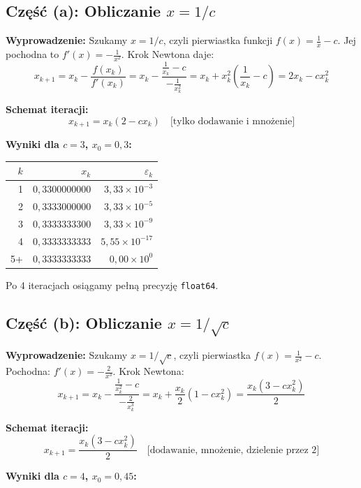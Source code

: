 \documentclass[12pt, a4paper]{article}
\begin{document}
\subsection{Część (a): Obliczanie $x = 1/c$}

\textbf{Wyprowadzenie:} Szukamy $x = 1/c$, czyli pierwiastka funkcji $f(x) = \frac{1}{x} - c$. Jej pochodna to $f'(x) = -\frac{1}{x^2}$. Krok Newtona daje:
\[
  x_{k+1} = x_k - \frac{f(x_k)}{f'(x_k)} = x_k - \frac{\frac{1}{x_k} - c}{-\frac{1}{x_k^2}} = x_k + x_k^2\left(\frac{1}{x_k} - c\right) = 2x_k - cx_k^2
\]

\textbf{Schemat iteracji:}
\[
  x_{k+1} = x_k(2 - cx_k) \quad \text{[tylko dodawanie i mnożenie]}
\]

\textbf{Wyniki dla $c = 3$, $x_0 = 0{,}3$:}

\begin{center}
\begin{tabular}{r|r|r}
\toprule
$k$ & $x_k$ & $\varepsilon_k$ \\
\midrule
1 & $0{,}3300000000$ & $3{,}33 \times 10^{-3}$ \\
2 & $0{,}3333000000$ & $3{,}33 \times 10^{-5}$ \\
3 & $0{,}3333333300$ & $3{,}33 \times 10^{-9}$ \\
4 & $0{,}3333333333$ & $5{,}55 \times 10^{-17}$ \\
5+ & $0{,}3333333333$ & $0{,}00 \times 10^{0}$ \\
\bottomrule
\end{tabular}
\end{center}

Po 4 iteracjach osiągamy pełną precyzję \texttt{float64}.

\subsection{Część (b): Obliczanie $x = 1/\sqrt{c}$}

\textbf{Wyprowadzenie:} Szukamy $x = 1/\sqrt{c}$, czyli pierwiastka $f(x) = \frac{1}{x^2} - c$. Pochodna: $f'(x) = -\frac{2}{x^3}$. Krok Newtona:
\[
  x_{k+1} = x_k - \frac{\frac{1}{x_k^2} - c}{-\frac{2}{x_k^3}} = x_k + \frac{x_k}{2}\left(1 - cx_k^2\right) = \frac{x_k(3 - cx_k^2)}{2}
\]

\textbf{Schemat iteracji:}
\[
  x_{k+1} = \frac{x_k(3 - cx_k^2)}{2} \quad \text{[dodawanie, mnożenie, dzielenie przez 2]}
\]

\textbf{Wyniki dla $c = 4$, $x_0 = 0{,}45$:}
\end{document}
